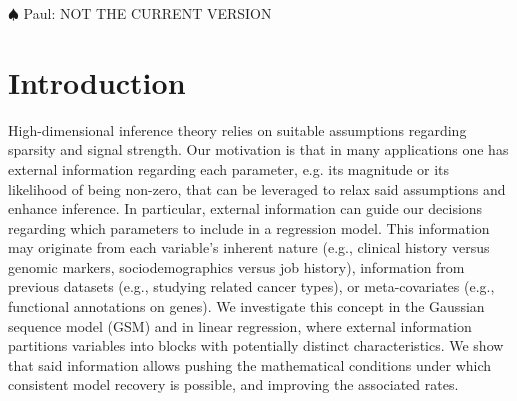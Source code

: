 \documentclass[aos]{imsart}
\theoremstyle{plain}
\newcommand{\paul}[1]{{\small{\color{green} \sf $\spadesuit$ Paul: #1}}}
\begin{document}


\paul{\Large NOT THE CURRENT VERSION}

\section{Introduction} 

High-dimensional inference theory relies on suitable assumptions regarding sparsity and signal strength.
Our motivation is that in many applications one has external information regarding each parameter, e.g. its magnitude or its likelihood of being non-zero, that can be leveraged to relax said assumptions and enhance inference.
In particular, external information can guide our decisions regarding which parameters to include in a regression model. This information may originate from each variable's inherent nature (e.g., clinical history versus genomic markers, sociodemographics versus job history),
information from previous datasets (e.g., studying related cancer types), or meta-covariates
(e.g., functional annotations on genes). 
We investigate this concept in the Gaussian sequence model (GSM) and in linear regression, where external information partitions variables into blocks with potentially distinct characteristics. We show that said information allows pushing the mathematical conditions under which consistent model recovery is possible, and improving the associated rates.
\end{document}

